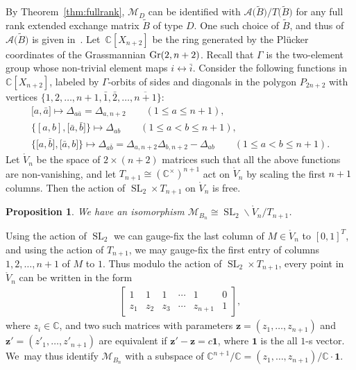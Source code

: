 \documentclass[10pt,a4paper]{amsart}
\def\C{{\mathbb C}}
\def\A{{\mathcal{A}}}
\def\Gr{{\rm Gr}}
\def\oV{{\mathring{V}}}
\def\tB{{\tilde B}}
\def\M{{\mathcal{M}}}
\def\tB{{\tilde B}}
\def\z{{\mathbf z}}
\def\one{{\mathbf 1}}
\def\SL{\operatorname{SL}}
\numberwithin{equation}{section}
\newtheorem{Proposition}[Theorem]{Proposition}
\begin{document}
\bigskip{}
By Theorem~\ref{thm:fullrank}, $\M_D$ can be identified with $\A\big(\tB\big)/T\big(\tB\big)$ for any full rank extended exchange matrix $\tB$ of type $D$. One such choice of $\tB$, and thus of $\A\big(\tB\big)$ is given in~\cite[Example 12.10]{CA2}. Let~$\C[X_{n+2}]$ be the ring generated by the Pl\"ucker coordinates of the Grassmannian $\Gr(2,n+2)$. Recall that $\Gamma$ is the two-element group whose non-trivial element maps $i \leftrightarrow \bar i$. Consider the following functions in $\C[X_{n+2}]$, labeled by $\Gamma$-orbits of sides and diagonals in the polygon $P_{2n+2}$ with vertices $\big\{1,2,\dots,n+1,\bar 1, \bar 2, \dots, \overline{n+1}\big\}$:
\begin{gather*}
\big[a, \bar a\big] \mapsto \Delta_{a \bar a} = \Delta_{a,n+2} \qquad (1 \leq a \leq n+1),
\\[.5ex]
\big\{[a,b],\big[\bar a, \bar b\big]\big\} \mapsto \Delta_{ab} \qquad (1 \leq a < b \leq n+1),
\\[.5ex]
\big\{\big[a,\bar b\big],\big[\bar a, b\big]\big\} \mapsto \Delta_{a \bar b} = \Delta_{a,n+2} \Delta_{b,n+2} - \Delta_{ab}\qquad
(1 \leq a < b \leq n+1).
\end{gather*}
Let $\oV_n$ be the space of $2 \times (n+2)$ matrices such that all the above functions are non-vanishing, and let $T_{n+1} \cong (\C^\times)^{n+1}$ act on $\oV_n$ by scaling the first $n+1$ columns. Then the action of $\SL_2 \times T_{n+1}$ on $\oV_n$ is free.
\begin{Proposition}
We have an isomorphism $\M_{B_n} \cong \SL_2 \backslash \oV_n/T_{n+1}$.
\end{Proposition}
Using the action of $\SL_2$ we can gauge-fix the last column of $M \in \oV_n$ to $[0,1]^T$, and using the action of $T_{n+1}$, we may gauge-fix the first entry of columns $1,2,\dots,n+1$ of $M$ to $1$.
Thus modulo the action of $\SL_2 \times T_{n+1}$, every point in $\oV_n$ can be written in the form\vspace{-.5ex}
\begin{gather*}
\begin{bmatrix}
1 & 1 & 1 & \cdots &1 & 0 \\
z_1 & z_2 & z_3 & \cdots & z_{n+1} & 1
\end{bmatrix}\!,
\end{gather*}
where $z_i \in \C$, and two such matrices with parameters $\z = (z_1,\dots,z_{n+1})$ and $\z'=(z'_1,\dots,z'_{n+1})$ are equivalent if $\z' -\z = c \one$, where $\one$ is the all $1$-s vector. We~may thus identify $\M_{B_n}$ with a subspace of $\C^{n+1}/\C= (z_1,\dots,z_{n+1})/\C\cdot \one$.
\end{document}
